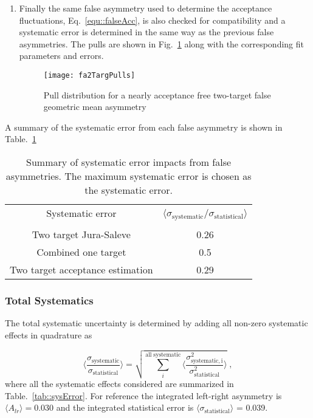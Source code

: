 \begin{enumerate}
\item Finally the same false asymmetry used to determine the acceptance
  fluctuations, Eq.~\ref{equ::falseAcc}, is also checked for compatibility and a
  systematic error is determined in the same way as the previous false
  asymmetries.  The pulls are shown in Fig.~\ref{fig::fa2TargPulls} along with
  the corresponding fit parameters and errors.

  \begin{figure}[h!t]
    \centering \texttt{[image: fa2TargPulls]}
    \caption{Pull distribution for a nearly acceptance free two-target false
      geometric mean asymmetry}
    \label{fig::fa2TargPulls}
  \end{figure}
  
\end{enumerate}

A summary of the systematic error from each false asymmetry is shown in
Table.~\ref{tab::faSys}

\begin{table}[h!t]
  \centering
  \begin{tabular}{|c|c|}
    \hline Systematic error& \multirow{2}{9em}{$\langle
      \sigma_{\mathrm{systematic}}/\sigma_{\mathrm{statistical}}
      \rangle$}\\ & \\ \hline
    
    Two target Jura-Saleve& 0.26\\ \hline

    Combined one target& 0.5\\ \hline

    Two target acceptance estimation& 0.29\\ \hline
    
  \end{tabular}
  \caption{Summary of systematic error impacts from false asymmetries.  The
    maximum systematic error is chosen as the systematic error.}
  \label{tab::faSys}
\end{table}

\subsubsection{Total Systematics}
The total systematic uncertainty is determined by adding all non-zero systematic
effects in quadrature as

\begin{equation}
  \Big \langle \frac{
    \sigma_{\mathrm{systematic}}}{\sigma_{\mathrm{statistical}}} \Big \rangle =
  \sqrt{ \sum_i^{\mathrm{all \; systematic}} \Big \langle
    \frac{\sigma^2_{\mathrm{systematic, i}}}{\sigma^2_{\mathrm{statistical}}}
    \Big \rangle } \;,
\end{equation}
where all the systematic effects considered are summarized in
Table.~\ref{tab::sysError}.  For reference the integrated left-right asymmetry
is $\langle A_{lr} \rangle = 0.030$ and the integrated statistical error is
$\langle \sigma_{\mathrm{statistical}} \rangle$ = 0.039.

